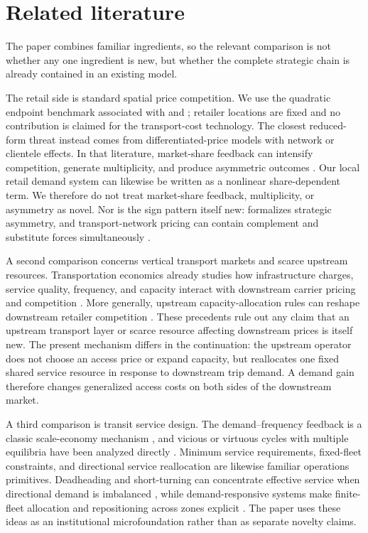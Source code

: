 \section{Related literature}\label{sec:literature}

The paper combines familiar ingredients, so the relevant comparison is not whether any one ingredient is new, but whether the complete strategic chain is already contained in an existing model.

The retail side is standard spatial price competition. We use the quadratic endpoint benchmark associated with \citet{hotelling1929} and \citet{daspremont1979}; retailer locations are fixed and no contribution is claimed for the transport-cost technology. The closest reduced-form threat instead comes from differentiated-price models with network or clientele effects. In that literature, market-share feedback can intensify competition, generate multiplicity, and produce asymmetric outcomes \citep{grilo2001,grivavettas2011,tolottiyepez2020,toshimitsu2026}. Our local retail demand system can likewise be written as a nonlinear share-dependent term. We therefore do not treat market-share feedback, multiplicity, or asymmetry as novel. Nor is the sign pattern itself new: \citet{tombak2006} formalizes strategic asymmetry, and transport-network pricing can contain complement and substitute forces simultaneously \citep{mchardy2024}.

A second comparison concerns vertical transport markets and scarce upstream resources. Transportation economics already studies how infrastructure charges, service quality, frequency, and capacity interact with downstream carrier pricing and competition \citep{bassozhang2007,depalma2018,alvarez2020}. More generally, upstream capacity-allocation rules can reshape downstream retailer competition \citep{chenli2013}. These precedents rule out any claim that an upstream transport layer or scarce resource affecting downstream prices is itself new. The present mechanism differs in the continuation: the upstream operator does not choose an access price or expand capacity, but reallocates one fixed shared service resource in response to downstream trip demand. A demand gain therefore changes generalized access costs on both sides of the downstream market.

A third comparison is transit service design. The demand--frequency feedback is a classic scale-economy mechanism \citep{mohring1972}, and vicious or virtuous cycles with multiple equilibria have been analyzed directly \citep{baryosef2013}. Minimum service requirements, fixed-fleet constraints, and directional service reallocation are likewise familiar operations primitives. Deadheading and short-turning can concentrate effective service when directional demand is imbalanced \citep{furth1985,cortes2011}, while demand-responsive systems make finite-fleet allocation and repositioning across zones explicit \citep{liuouyang2021}. The paper uses these ideas as an institutional microfoundation rather than as separate novelty claims.

